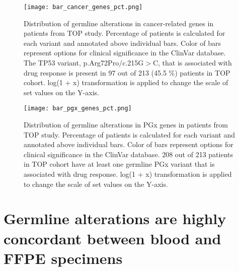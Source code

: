
\begin{landscape}

\begin{figure}[H]
\centering
	\texttt{[image: bar\_cancer\_genes\_pct.png]}
	\caption[Distribution of germline alterations in cancer-related genes in patients from TOP study.]{Distribution of germline alterations in cancer-related genes in patients from TOP study. Percentage of patients is calculated for each variant and annotated above individual bars. Color of bars represent options for clinical significance in the ClinVar database. The TP53 variant, p.Arg72Pro$/$c.215G$>$C, that is associated with drug response is present in 97 out of 213 (45.5 \%) patients in TOP cohort. log(1 + x) transformation is applied to change the scale of set values on the Y-axis.}
	\label{fig:bar_cancer_genes}
\end{figure}

\end{landscape}


\begin{landscape}

\begin{figure}[H]
\centering
	\texttt{[image: bar\_pgx\_genes\_pct.png]}
	\caption[Distribution of germline alterations in PGx genes in patients from TOP study.]{Distribution of germline alterations in PGx genes in patients from TOP study. Percentage of patients is calculated for each variant and annotated above individual bars. Color of bars represent options for clinical significance in the ClinVar database. 208 out of 213 patients in TOP cohort have at least one germline PGx variant that is associated with drug response. log(1 + x) transformation is applied to change the scale of set values on the Y-axis.}
	\label{fig:bar_pgx_genes}
\end{figure}

\end{landscape}

\section{Germline alterations are highly concordant between blood and FFPE specimens}
\label{sec:GermlinealterationsarehighlyconcordantbetweenbloodandFFPEspecimens}


